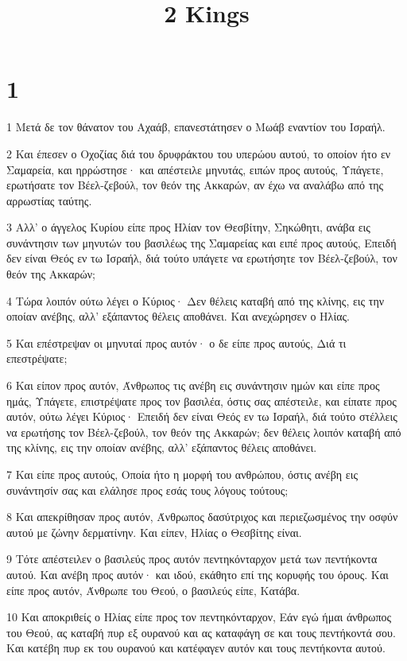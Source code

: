 

\title{2 Kings}


\chapter{1}

\par 1 Μετά δε τον θάνατον του Αχαάβ, επανεστάτησεν ο Μωάβ εναντίον του Ισραήλ.
\par 2 Και έπεσεν ο Οχοζίας διά του δρυφράκτου του υπερώου αυτού, το οποίον ήτο εν Σαμαρεία, και ηρρώστησε· και απέστειλε μηνυτάς, ειπών προς αυτούς, Υπάγετε, ερωτήσατε τον Βέελ-ζεβούλ, τον θεόν της Ακκαρών, αν έχω να αναλάβω από της αρρωστίας ταύτης.
\par 3 Αλλ' ο άγγελος Κυρίου είπε προς Ηλίαν τον Θεσβίτην, Σηκώθητι, ανάβα εις συνάντησιν των μηνυτών του βασιλέως της Σαμαρείας και ειπέ προς αυτούς, Επειδή δεν είναι Θεός εν τω Ισραήλ, διά τούτο υπάγετε να ερωτήσητε τον Βέελ-ζεβούλ, τον θεόν της Ακκαρών;
\par 4 Τώρα λοιπόν ούτω λέγει ο Κύριος· Δεν θέλεις καταβή από της κλίνης, εις την οποίαν ανέβης, αλλ' εξάπαντος θέλεις αποθάνει. Και ανεχώρησεν ο Ηλίας.
\par 5 Και επέστρεψαν οι μηνυταί προς αυτόν· ο δε είπε προς αυτούς, Διά τι επεστρέψατε;
\par 6 Και είπον προς αυτόν, Άνθρωπος τις ανέβη εις συνάντησιν ημών και είπε προς ημάς, Υπάγετε, επιστρέψατε προς τον βασιλέα, όστις σας απέστειλε, και είπατε προς αυτόν, ούτω λέγει Κύριος· Επειδή δεν είναι Θεός εν τω Ισραήλ, διά τούτο στέλλεις να ερωτήσης τον Βέελ-ζεβούλ, τον θεόν της Ακκαρών; δεν θέλεις λοιπόν καταβή από της κλίνης, εις την οποίαν ανέβης, αλλ' εξάπαντος θέλεις αποθάνει.
\par 7 Και είπε προς αυτούς, Οποία ήτο η μορφή του ανθρώπου, όστις ανέβη εις συνάντησίν σας και ελάλησε προς εσάς τους λόγους τούτους;
\par 8 Και απεκρίθησαν προς αυτόν, Άνθρωπος δασύτριχος και περιεζωσμένος την οσφύν αυτού με ζώνην δερματίνην. Και είπεν, Ηλίας ο Θεσβίτης είναι.
\par 9 Τότε απέστειλεν ο βασιλεύς προς αυτόν πεντηκόνταρχον μετά των πεντήκοντα αυτού. Και ανέβη προς αυτόν· και ιδού, εκάθητο επί της κορυφής του όρους. Και είπε προς αυτόν, Άνθρωπε του Θεού, ο βασιλεύς είπε, Κατάβα.
\par 10 Και αποκριθείς ο Ηλίας είπε προς τον πεντηκόνταρχον, Εάν εγώ ήμαι άνθρωπος του Θεού, ας καταβή πυρ εξ ουρανού και ας καταφάγη σε και τους πεντήκοντά σου. Και κατέβη πυρ εκ του ουρανού και κατέφαγεν αυτόν και τους πεντήκοντα αυτού.
